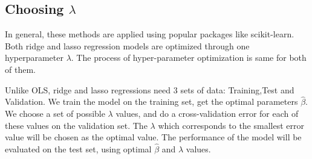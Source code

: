\documentclass{article}
\begin{document}
\subsection*{Choosing $\lambda$}
In general, these methods are applied using popular packages like scikit-learn. Both ridge and lasso regression models are optimized through one hyperparameter $\lambda$. The process of hyper-parameter optimization is same for both of them.

Unlike OLS, ridge and lasso regressions need 3 sets of data: Training,Test and Validation.
We train the model on the training set, get the optimal parameters $\hat{\beta}$. We choose a set of possible $\lambda$ values, and do a cross-validation error for each of these values on the validation set. The $\lambda$ which corresponds to the smallest error value will be chosen as the optimal value. The performance of the model will be evaluated on the test set, using optimal $\hat{\beta}$ and $\lambda$ values.
\end{document}
